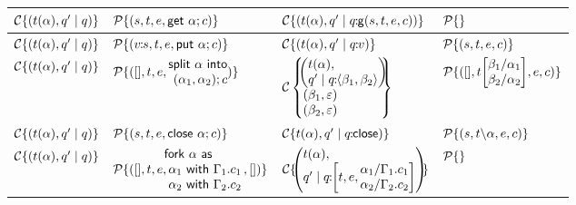 \documentclass[11pt]{article}
\newcommand{\<}{\langle}
\renewcommand{\>}{\rangle}
\begin{document}
\begin{table}
\begin{center}
\begin{tabular}{|l|l||l|l|} \hline
${\cal C}\{ (t(\alpha), q'\mid q) \} $ & ${\cal P}\{ (s,t,e,{\sf get}~\alpha;c) \}$ 
   & ${\cal C}\{ (t(\alpha),q' \mid q\!\!:\!\!{\sf g}(s,t,e,c)) \}$ & ${\cal P}\{ \}$ \\ \hline
${\cal C}\{ (t(\alpha),q' \mid q)\}$ & ${\cal P}\{ (v\!\!:\!\!s,t,e,{\sf put}~\alpha;c) \}$ & 
${\cal C}\{ (t(\alpha),q' \mid q\!\!:\!\!v)\} $ & ${\cal P}\{ (s,t,e,c) \}$ \\ \hline
${\cal C}\{ (t(\alpha), q' \mid q) \}$ & ${\cal P}\{ ([],t,e,\!\!\!\begin{array}[c]{r}{\sf split}~\alpha~{\sf into}\\ ~(\alpha_1,\alpha_2); c \end{array}\!\!\!) \} $ &
         ${\cal C}\left\{ \!\!\!\begin{array}[c]{l} \!\!\left(\!\!\!\begin{array}[c]{l} t(\alpha), \\ q' \mid q\!\!:\!\! \< \beta_1,\beta_2 \>\end{array} \!\!\!\right) \!\!\\ (\beta_1,\varepsilon) \\ (\beta_2,\varepsilon) \end{array} \!\!\!\!\right\}$ & ${\cal P}\{ ([],t \!\left[ \!\!\!\begin{array}{l} \beta_1/\alpha_1\\ \beta_2/\alpha_2 \end{array} \!\!\!\right]\!,e,c) \}$ \\ \hline
${\cal C}\{ (t(\alpha),q'\mid q) \}$ & ${\cal P}\{ (s,t,e,{\sf close}~\alpha;c)\} $ & ${\cal C}\{ t(\alpha),q' \mid q\!\!:\!\!{\sf close}) \}$ & ${\cal P}\{ (s,t\backslash\alpha,e,c)\}$ \\ \hline
${\cal C}\{ (t(\alpha),q' \mid q) \}$ & ${\cal P}\{ ([],t,e, \!\!\!\!\!\begin{array}[c]{l}{\sf fork} ~ \alpha~{\sf as} \\
                           ~\alpha_1~{\sf with}~\Gamma_1. c_1 \\
                           ~\alpha_2~{\sf with}~\Gamma_2. c_2  \end{array}\!\!,[]) \} $ 
              & ${\cal C}\{\!\! \left(\!\!\!\begin{array}{l} t(\alpha),\\ q'\mid q\!\!:\!\!\left[t,e,\!\!\!\begin{array}[c]{l} \alpha_1/\Gamma_1. c_1 \\ \alpha_2/\Gamma_2. c_2 \end{array} \!\!\!\right] \end{array}\!\!\!\right)\!\!\}$ & ${\cal P}\{\}$ \\ \hline

\end{tabular}
\end{center}
\end{table}
\end{document}
